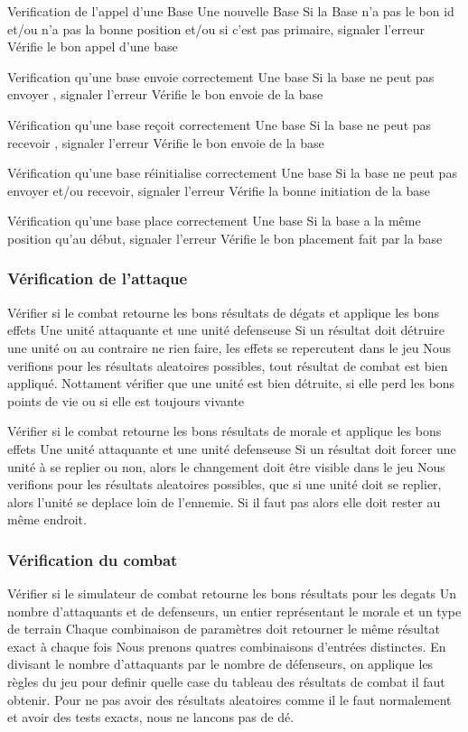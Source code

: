 \mytest
{Verification de l'appel d'une Base}
{Une nouvelle Base}
{Si la Base n'a pas le bon id et/ou n'a pas la bonne position et/ou si c'est pas primaire, signaler l'erreur }
{Vérifie le bon appel d'une base}

\mytest
{Verification qu'une base envoie correctement}
{Une base}
{Si la base ne peut pas envoyer ,  signaler l'erreur }
{Vérifie le bon envoie de la base }

\mytest
{Vérification qu'une base reçoit correctement}
{Une base}
{Si la base ne peut pas recevoir ,  signaler l'erreur }
{Vérifie le bon envoie de la base }

\mytest
{Vérification qu'une base réinitialise correctement}
{Une base}
{Si la base ne peut pas envoyer et/ou recevoir,  signaler l'erreur }
{Vérifie la bonne initiation de la base }

\mytest
{Vérification qu'une base place correctement}
{Une base}
{Si la base a la même position qu'au début,  signaler l'erreur }
{Vérifie le bon placement fait par la  base }

\subsubsection{Vérification de l'attaque}

\mytest
{Vérifier si le combat retourne les bons résultats de dégats et applique les bons effets}
{Une unité attaquante et une unité defenseuse}
{Si un résultat doit détruire une unité ou au contraire ne rien faire, les effets se repercutent dans le jeu}
{Nous verifions pour les résultats aleatoires possibles, tout résultat de combat est bien appliqué. Nottament vérifier
    que une unité est bien détruite, si elle perd les bons points de vie ou si elle est toujours vivante}

\mytest
{Vérifier si le combat retourne les bons résultats de morale et applique les bons effets}
{Une unité attaquante et une unité defenseuse}
{Si un résultat doit forcer une unité à se replier ou non, alors le changement doit être visible dans le jeu}
{Nous verifions pour les résultats aleatoires possibles, que si une unité doit se replier, alors l'unité se
    deplace loin de l'ennemie. Si il faut pas alors elle doit rester au même endroit.}

\subsubsection{Vérification du combat}

\mytest
{Vérifier si le simulateur de combat retourne les bons résultats pour les degats}
{Un nombre d'attaquants et de defenseurs, un entier représentant le morale et un type de terrain}
{Chaque combinaison de paramètres doit retourner le même résultat exact à chaque fois}
{Nous prenons quatres combinaisons d'entrées distinctes.
    En divisant le nombre d'attaquants par le nombre de défenseurs, on applique les règles du jeu pour definir
    quelle case du tableau des résultats de combat il faut obtenir. Pour ne pas avoir des résultats aleatoires comme
    il le faut normalement et avoir des tests exacts, nous ne lancons pas de dé.}

